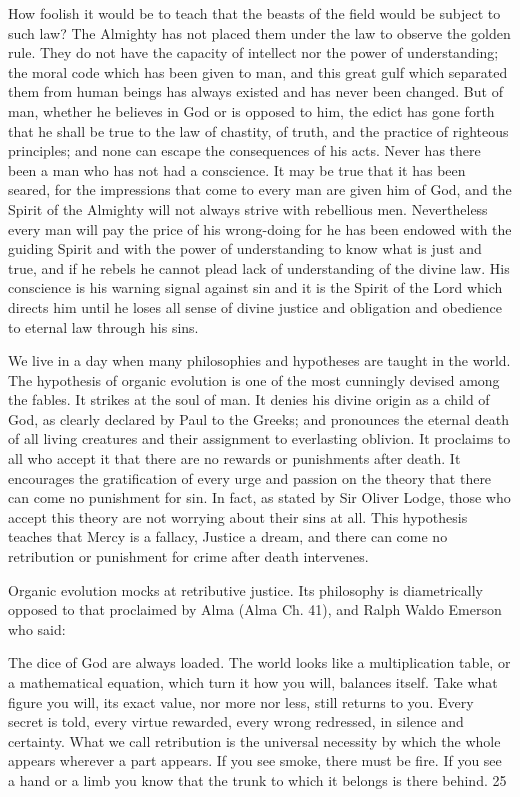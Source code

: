 How foolish it would be to teach that the beasts of the field would be subject to such law?
The Almighty has not placed them under the law to observe the golden rule. They do not
have the capacity of intellect nor the power of understanding; the moral code which has been
given to man, and this great gulf which separated them from human beings has always
existed and has never been changed. But of man, whether he believes in God or is opposed to
him, the edict has gone forth that he shall be true to the law of chastity, of truth, and the
practice of righteous principles; and none can escape the consequences of his acts. Never has
there been a man who has not had a conscience. It may be true that it has been seared, for the
impressions that come to every man are given him of God, and the Spirit of the Almighty
will not always strive with rebellious men. Nevertheless every man will pay the price of his
wrong-doing for he has been endowed with the guiding Spirit and with the power of
understanding to know what is just and true, and if he rebels he cannot plead lack of
understanding of the divine law. His conscience is his warning signal against sin and it is the
Spirit of the Lord which directs him until he loses all sense of divine justice and obligation
and obedience to eternal law through his sins.

We live in a day when many philosophies and hypotheses are taught in the world. The
hypothesis of organic evolution is one of the most cunningly devised among the fables. It
strikes at the soul of man. It denies his divine origin as a child of God, as clearly declared by
Paul to the Greeks; and pronounces the eternal death of all living creatures and their
assignment to everlasting oblivion. It proclaims to all who accept it that there are no rewards
or punishments after death. It encourages the gratification of every urge and passion on the
theory that there can come no punishment for sin. In fact, as stated by Sir Oliver Lodge, those
who accept this theory are not worrying about their sins at all. This hypothesis teaches that
Mercy is a fallacy, Justice a dream, and there can come no retribution or punishment for
crime after death intervenes.

Organic evolution mocks at retributive justice. Its philosophy is diametrically opposed to that
proclaimed by Alma (Alma Ch. 41), and Ralph Waldo Emerson who said:

The dice of God are always loaded. The world looks like a multiplication table, or a
mathematical equation, which turn it how you will, balances itself. Take what figure you
will, its exact value, nor more nor less, still returns to you. Every secret is told, every virtue
rewarded, every wrong redressed, in silence and certainty. What we call retribution is the
universal necessity by which the whole appears wherever a part appears. If you see smoke,
there must be fire. If you see a hand or a limb you know that the trunk to which it belongs is
there behind. 25

